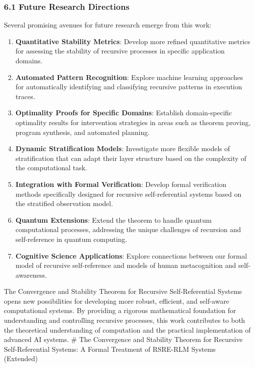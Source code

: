 \documentclass[
]{article}
\begin{document}
\subsubsection{6.1 Future Research
Directions}\label{future-research-directions-4}

Several promising avenues for future research emerge from this work:

\begin{enumerate}
\def\labelenumi{\arabic{enumi}.}
\item
  \textbf{Quantitative Stability Metrics}: Develop more refined
  quantitative metrics for assessing the stability of recursive
  processes in specific application domains.
\item
  \textbf{Automated Pattern Recognition}: Explore machine learning
  approaches for automatically identifying and classifying recursive
  patterns in execution traces.
\item
  \textbf{Optimality Proofs for Specific Domains}: Establish
  domain-specific optimality results for intervention strategies in
  areas such as theorem proving, program synthesis, and automated
  planning.
\item
  \textbf{Dynamic Stratification Models}: Investigate more flexible
  models of stratification that can adapt their layer structure based on
  the complexity of the computational task.
\item
  \textbf{Integration with Formal Verification}: Develop formal
  verification methods specifically designed for recursive
  self-referential systems based on the stratified observation model.
\item
  \textbf{Quantum Extensions}: Extend the theorem to handle quantum
  computational processes, addressing the unique challenges of recursion
  and self-reference in quantum computing.
\item
  \textbf{Cognitive Science Applications}: Explore connections between
  our formal model of recursive self-reference and models of human
  metacognition and self-awareness.
\end{enumerate}

The Convergence and Stability Theorem for Recursive Self-Referential
Systems opens new possibilities for developing more robust, efficient,
and self-aware computational systems. By providing a rigorous
mathematical foundation for understanding and controlling recursive
processes, this work contributes to both the theoretical understanding
of computation and the practical implementation of advanced AI systems.
\# The Convergence and Stability Theorem for Recursive Self-Referential
Systems: A Formal Treatment of RSRE-RLM Systems (Extended)
\end{document}
